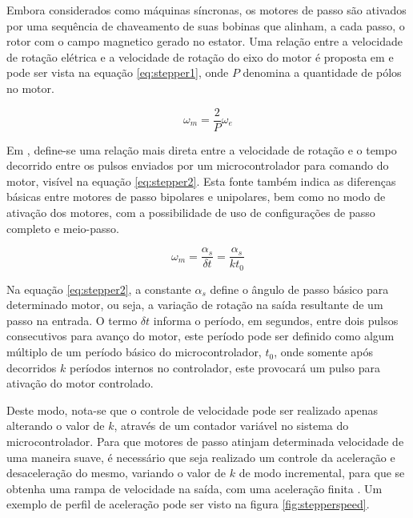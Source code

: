 Embora considerados como máquinas síncronas, os motores de passo são
ativados por uma sequência de chaveamento de suas bobinas que alinham,
a cada passo, o rotor com o campo magnetico gerado no estator. Uma 
relação entre a velocidade de rotação elétrica e a velocidade de rotação do
eixo do motor é proposta em \cite{chapman2005electric} e pode ser vista
na equação \ref{eq:stepper1}, onde $P$ denomina a quantidade de pólos
no motor. 

\begin{equation}
    \label{eq:stepper1}
    \omega_m = \frac{2}{P}\omega_e
\end{equation}

Em \cite{atmel2006stepper}, define-se uma relação mais direta entre 
a velocidade de rotação e o tempo decorrido entre os pulsos enviados por um 
microcontrolador para comando do motor, visível na equação \ref{eq:stepper2}. 
Esta fonte também indica as diferenças básicas entre motores de passo
bipolares e unipolares, bem como no modo de ativação dos motores, com
a possibilidade de uso de configurações de passo completo e meio-passo.

\begin{equation}
    \label{eq:stepper2}
    \omega_m = \frac{\alpha_s}{\delta t} = \frac{\alpha_s}{kt_0}
\end{equation}

Na equação \ref{eq:stepper2}, a constante $\alpha_s$ define o ângulo de passo
básico para determinado motor, ou seja, a variação de rotação na saída 
resultante de um passo na entrada. O termo $\delta t$ informa o período,
em segundos, entre dois pulsos consecutivos para avanço do motor, 
este período pode ser definido como algum múltiplo de um período básico
do microcontrolador, $t_0$, onde somente após decorridos
$k$ períodos internos no controlador, este provocará um pulso para ativação
do motor controlado.

Deste modo, nota-se que o controle de velocidade pode ser realizado
apenas alterando o valor de $k$, através de um contador variável no 
sistema do microcontrolador. Para que motores de passo atinjam determinada
velocidade de uma maneira suave, é necessário que seja realizado um 
controle da aceleração e desaceleração do mesmo, 
variando o valor de $k$ de modo incremental, para que se obtenha uma
rampa de velocidade na saída, com uma aceleração finita \cite{atmel2006stepper}.
Um exemplo de perfil de aceleração pode ser visto na figura \ref{fig:stepperspeed}.

